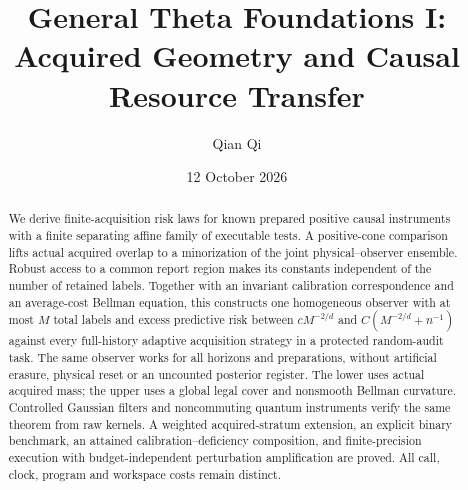 \documentclass[11pt]{amsart}
\title[General Theta Foundations I]{General Theta Foundations I:\\Acquired Geometry and Causal Resource Transfer}
\author{Qian Qi}\date{12 October 2026}
\theoremstyle{definition}\newtheorem{definition}[theorem]{Definition}
\theoremstyle{remark}\newtheorem{remark}[theorem]{Remark}
\begin{document}
\raggedbottom
\begin{abstract}
We derive finite-acquisition risk laws for known prepared positive causal instruments with a finite separating affine family of executable tests. A positive-cone comparison lifts actual acquired overlap to a minorization of the joint physical--observer ensemble. Robust access to a common report region makes its constants independent of the number of retained labels. Together with an invariant calibration correspondence and an average-cost Bellman equation, this constructs one homogeneous observer with at most $M$ total labels and excess predictive risk between $cM^{-2/d}$ and $C(M^{-2/d}+n^{-1})$ against every full-history adaptive acquisition strategy in a protected random-audit task. The same observer works for all horizons and preparations, without artificial erasure, physical reset or an uncounted posterior register. The lower uses actual acquired mass; the upper uses a global legal cover and nonsmooth Bellman curvature. Controlled Gaussian filters and noncommuting quantum instruments verify the same theorem from raw kernels. A weighted acquired-stratum extension, an explicit binary benchmark, an attained calibration--deficiency composition, and finite-precision execution with budget-independent perturbation amplification are proved. All call, clock, program and workspace costs remain distinct.
\end{abstract}\maketitle












\appendix

\end{document}

